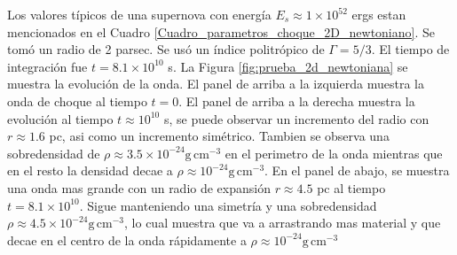 \documentclass[12pt,a4paper]{book}
\begin{document}
Los valores típicos de una supernova con energía $E_{s}  \approx  1 \times 10^{52}$ ergs estan mencionados en el Cuadro \ref{Cuadro_parametros_choque_2D_newtoniano}. Se tomó un radio de 
2 parsec. Se usó un índice politrópico de $\Gamma = 5/3$. El tiempo de integración fue $t = 8.1 \times 10^10$ s. La Figura \ref{fig:prueba_2d_newtoniana} se muestra la evolución de la onda. El panel de arriba a la izquierda
muestra la onda de choque al tiempo $t = 0$. El panel de arriba a la derecha muestra la evolución al tiempo $t \approx 10^{10}$ s, se puede observar un incremento del radio con $r \approx 1.6$ pc, asi como
un incremento simétrico. Tambien se observa una sobredensidad de $\rho \approx 3.5 \times 10^{-24} \text{g} \, \text{cm}^{-3}$ en el perimetro de la onda mientras que en el resto la densidad decae a 
$\rho \approx 10^{-24} \text{g} \, \text{cm}^{-3}$. En el panel de abajo, se muestra una onda mas grande con un radio de expansión $r \approx 4.5$ pc al tiempo $t = 8.1 \times 10^{10}$. Sigue manteniendo una simetría y
una sobredensidad $\rho \approx 4.5 \times 10^{-24} \text{g} \, \text{cm}^{-3}$, lo cual muestra que va a arrastrando mas material y que decae en el centro de la onda 
rápidamente a $\rho \approx 10^{-24} \text{g} \, \text{cm}^{-3}$
\end{document}
